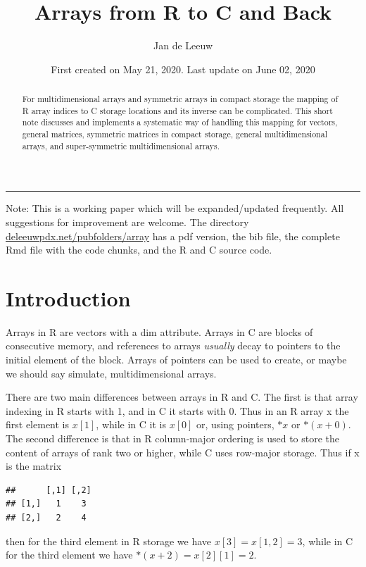 \documentclass[
  12pt,
]{article}
\title{Arrays from R to C and Back}
\author{Jan de Leeuw}
\date{First created on May 21, 2020. Last update on June 02, 2020}
\begin{document}
\maketitle
\begin{abstract}
For multidimensional arrays and symmetric arrays in compact storage the
mapping of R array indices to C storage locations and its inverse can be
complicated. This short note discusses and implements a systematic way
of handling this mapping for vectors, general matrices, symmetric
matrices in compact storage, general multidimensional arrays, and
super-symmetric multidimensional arrays.
\end{abstract}

{
\setcounter{tocdepth}{4}
\tableofcontents
}
\begin{center}\rule{0.5\linewidth}{0.5pt}\end{center}

Note: This is a working paper which will be expanded/updated frequently.
All suggestions for improvement are welcome. The directory
\href{http://deleeuwpdx.net/pubfolders/array}{deleeuwpdx.net/pubfolders/array}
has a pdf version, the bib file, the complete Rmd file with the code
chunks, and the R and C source code.

\hypertarget{introduction}{%
\section{Introduction}\label{introduction}}

Arrays in R are vectors with a dim attribute. Arrays in C are blocks of
consecutive memory, and references to arrays \emph{usually} decay to
pointers to the initial element of the block. Arrays of pointers can be
used to create, or maybe we should say simulate, multidimensional
arrays.

There are two main differences between arrays in R and C. The first is
that array indexing in R starts with 1, and in C it starts with 0. Thus
in an R array x the first element is \(x[1]\), while in C it is \(x[0]\)
or, using pointers, \(*x\) or \(*(x + 0)\). The second difference is
that in R column-major ordering is used to store the content of arrays
of rank two or higher, while C uses row-major storage. Thus if x is the
matrix

\begin{verbatim}
##      [,1] [,2]
## [1,]   1    3 
## [2,]   2    4
\end{verbatim}

then for the third element in R storage we have \(x[3]=x[1,2]=3\), while
in C for the third element we have \(*(x + 2)=x[2][1]=2\).
\end{document}
